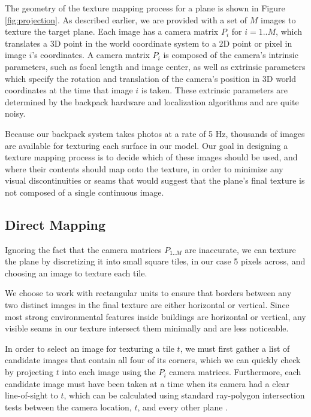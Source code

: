 \documentclass[]{spie}  %
\begin{document}
The geometry of the texture mapping process for a plane is shown in
Figure \ref{fig:projection}.  As described earlier, we are provided
with a set of $M$ images to texture the target plane. Each image has a
camera matrix $P_i$ for $i=1..M$, which translates a 3D point in the
world coordinate system to a 2D point or pixel in image $i$'s
coordinates. A camera matrix $P_i$ is composed of the camera's
intrinsic parameters, such as focal length and image center, as well
as extrinsic parameters which specify the rotation and translation of
the camera's position in 3D world coordinates at the time that image
$i$ is taken. These extrinsic parameters are determined by the
backpack hardware and localization algorithms \cite{chen2010indoor,
  liu2010indoor, kua2012loopclosure} and are quite noisy.

Because our backpack system takes photos at a rate of 5 Hz, thousands
of images are available for texturing each surface in our model. Our
goal in designing a texture mapping process is to decide which of
these images should be used, and where their contents should map onto
the texture, in order to minimize any visual discontinuities or seams
that would suggest that the plane's final texture is not composed of a
single continuous image.

\subsection{Direct Mapping}
\label{sec:directMapping}

Ignoring the fact that the camera matrices $P_{1..M}$ are inaccurate,
we can texture the plane by discretizing it into small square tiles,
in our case 5 pixels across, and choosing an image to texture each
tile.

We choose to work with rectangular units to ensure that borders
between any two distinct images in the final texture are either
horizontal or vertical. Since most strong environmental features
inside buildings are horizontal or vertical, any visible seams in our
texture intersect them minimally and are less noticeable.

In order to select an image for texturing a tile $t$, we must first
gather a list of candidate images that contain all four of its
corners, which we can quickly check by projecting $t$ into each image
using the $P_i$ camera matrices. Furthermore, each candidate image
must have been taken at a time when its camera had a clear
line-of-sight to $t$, which can be calculated using standard
ray-polygon intersection tests between the camera location, $t$, and
every other plane \cite{rayintersection}.
\end{document}
